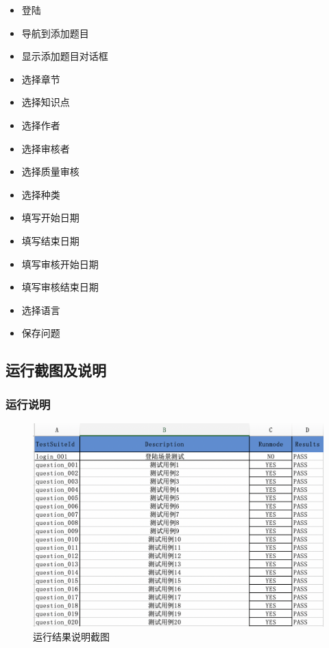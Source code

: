 \documentclass[hyperref, a4paper]{ctexart}
\providecommand{\tightlist}{%
  \setlength{\itemsep}{0pt}\setlength{\parskip}{0pt}}
\begin{document}
\begin{itemize}
\tightlist
\item
  登陆
\item
  导航到添加题目
\item
  显示添加题目对话框
\item
  选择章节
\item
  选择知识点
\item
  选择作者
\item
  选择审核者
\item
  选择质量审核
\item
  选择种类
\item
  填写开始日期
\item
  填写结束日期
\item
  填写审核开始日期
\item
  填写审核结束日期
\item
  选择语言
\item
  保存问题
\end{itemize}

\hypertarget{ux8fd0ux884cux622aux56feux53caux8bf4ux660e}{%
\subsection{运行截图及说明}\label{ux8fd0ux884cux622aux56feux53caux8bf4ux660e}}

\hypertarget{ux8fd0ux884cux8bf4ux660e}{%
\subsubsection{运行说明}\label{ux8fd0ux884cux8bf4ux660e}}

\begin{figure}
  \centering
  \includegraphics[scale=0.7]{./screenshots/result.jpg}
  \caption{运行结果说明截图}\label{4}
\end{figure}
\end{document}
